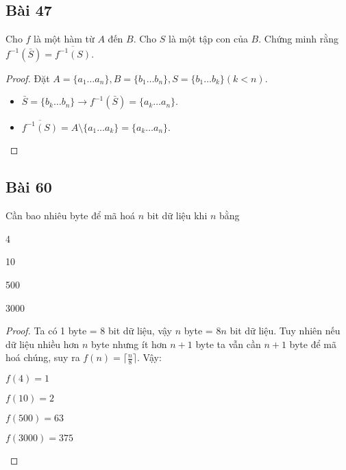 \subsection*{Bài 47}
Cho $f$ là một hàm từ $A$ đến $B$. Cho $S$ là một tập con của $B$. Chứng minh rằng $f^{-1}(\bar S)=\overline{f^{-1}(S)}$.
\begin{proof}
    Đặt $A=\{a_1\dots a_n\},B=\{b_1\dots b_n\},S=\{b_1\dots b_k\}(k<n)$.
    \begin{itemize}
        \item $\bar S=\{b_k\dots b_n\}\rightarrow f^{-1}(\bar S)=\{a_k\dots a_n\}$.
        \item $\overline{f^{-1}(S)}=A\setminus\{a_1\dots a_k\}=\{a_k\dots a_n\}$.
    \end{itemize}
\end{proof}
\subsection*{Bài 60}
Cần bao nhiêu byte để mã hoá $n$ bit dữ liệu khi $n$ bằng
\begin{enumerate}[label=\alph*)]
    \begin{multicols}{4}
        \item 4
        \item 10
        \item 500
        \item 3000
    \end{multicols}
\end{enumerate}
\begin{proof}
    Ta có 1 byte = 8 bit dữ liệu, vậy $n$ byte = $8n$ bit dữ liệu. Tuy nhiên nếu dữ liệu nhiều hơn $n$ byte nhưng ít hơn $n+1$ byte ta vẫn cần $n+1$ byte để mã hoá chúng, suy ra $f(n)=\lceil\frac{n}{8}\rceil$. Vậy:
    \begin{enumerate}[label=\alph*)]
        \begin{multicols}{4}
            \item $f(4)=1$
            \item $f(10)=2$
            \item $f(500)=63$
            \item $f(3000)=375$
        \end{multicols}
    \end{enumerate}
\end{proof}

